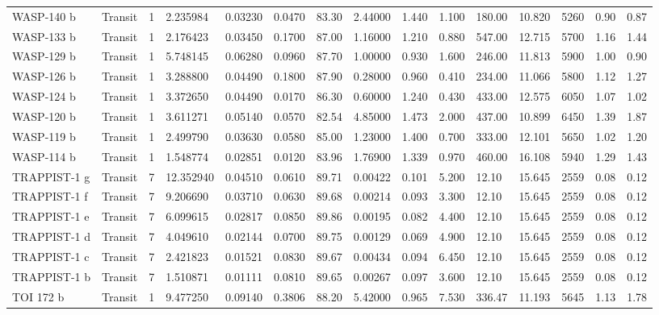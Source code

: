 \documentclass[11pt]{article}
\begin{document}
\begin{tabular}{lllllllllllllll}
	 WASP-140 b   & Transit & 1 &  2.235984 & 0.03230 & 0.0470 & 83.30 & 2.44000 & 1.440 & 1.100 &  180.00 & 10.820 & 5260 & 0.90 & 0.87\\
	 WASP-133 b   & Transit & 1 &  2.176423 & 0.03450 & 0.1700 & 87.00 & 1.16000 & 1.210 & 0.880 &  547.00 & 12.715 & 5700 & 1.16 & 1.44\\
	 WASP-129 b   & Transit & 1 &  5.748145 & 0.06280 & 0.0960 & 87.70 & 1.00000 & 0.930 & 1.600 &  246.00 & 11.813 & 5900 & 1.00 & 0.90\\
	 WASP-126 b   & Transit & 1 &  3.288800 & 0.04490 & 0.1800 & 87.90 & 0.28000 & 0.960 & 0.410 &  234.00 & 11.066 & 5800 & 1.12 & 1.27\\
	 WASP-124 b   & Transit & 1 &  3.372650 & 0.04490 & 0.0170 & 86.30 & 0.60000 & 1.240 & 0.430 &  433.00 & 12.575 & 6050 & 1.07 & 1.02\\
	 WASP-120 b   & Transit & 1 &  3.611271 & 0.05140 & 0.0570 & 82.54 & 4.85000 & 1.473 & 2.000 &  437.00 & 10.899 & 6450 & 1.39 & 1.87\\
	 WASP-119 b   & Transit & 1 &  2.499790 & 0.03630 & 0.0580 & 85.00 & 1.23000 & 1.400 & 0.700 &  333.00 & 12.101 & 5650 & 1.02 & 1.20\\
	 WASP-114 b   & Transit & 1 &  1.548774 & 0.02851 & 0.0120 & 83.96 & 1.76900 & 1.339 & 0.970 &  460.00 & 16.108 & 5940 & 1.29 & 1.43\\
	 TRAPPIST-1 g & Transit & 7 & 12.352940 & 0.04510 & 0.0610 & 89.71 & 0.00422 & 0.101 & 5.200 &   12.10 & 15.645 & 2559 & 0.08 & 0.12\\
	 TRAPPIST-1 f & Transit & 7 &  9.206690 & 0.03710 & 0.0630 & 89.68 & 0.00214 & 0.093 & 3.300 &   12.10 & 15.645 & 2559 & 0.08 & 0.12\\
	 TRAPPIST-1 e & Transit & 7 &  6.099615 & 0.02817 & 0.0850 & 89.86 & 0.00195 & 0.082 & 4.400 &   12.10 & 15.645 & 2559 & 0.08 & 0.12\\
	 TRAPPIST-1 d & Transit & 7 &  4.049610 & 0.02144 & 0.0700 & 89.75 & 0.00129 & 0.069 & 4.900 &   12.10 & 15.645 & 2559 & 0.08 & 0.12\\
	 TRAPPIST-1 c & Transit & 7 &  2.421823 & 0.01521 & 0.0830 & 89.67 & 0.00434 & 0.094 & 6.450 &   12.10 & 15.645 & 2559 & 0.08 & 0.12\\
	 TRAPPIST-1 b & Transit & 7 &  1.510871 & 0.01111 & 0.0810 & 89.65 & 0.00267 & 0.097 & 3.600 &   12.10 & 15.645 & 2559 & 0.08 & 0.12\\
	 TOI 172 b    & Transit & 1 &  9.477250 & 0.09140 & 0.3806 & 88.20 & 5.42000 & 0.965 & 7.530 &  336.47 & 11.193 & 5645 & 1.13 & 1.78\\

\end{tabular}
\end{document}

